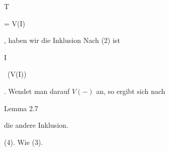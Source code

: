 {{\vergleichskette


{ T
}


{ = }{ V(I)
}


{  }{
}


{    }{
}


{   }{
}


}
{}{}{,}
haben wir die Inklusion  Nach (2) ist


\mavergleichskette


{\vergleichskette


{ I
}


{ \subseteq }{  \, (V(I))
}


{  }{
}


{    }{
}


{   }{
}


}
{}{}{.}
Wendet man darauf $V(-)$ an, so ergibt sich nach

Lemma 2.7

die andere Inklusion.


(4). Wie (3).


}




